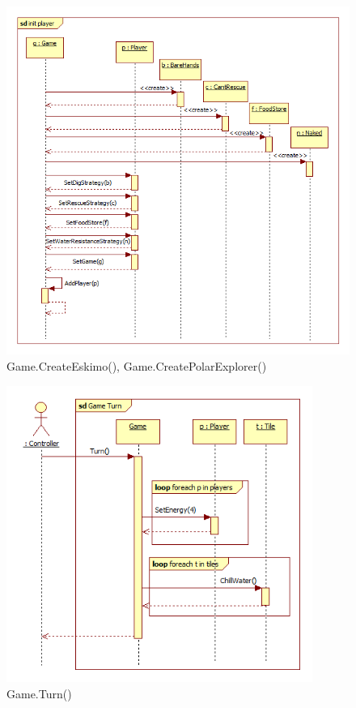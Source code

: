 \begin{figure}[H]
	\begin{center}
		\includegraphics[width=15cm]{chapters/chapter04/seqdiag/Game_init_player.png}
		\caption{Game.CreateEskimo(), Game.CreatePolarExplorer()}
		\label{fig:GameInitPlayer}
	\end{center}
\end{figure}
\begin{figure}[H]
	\begin{center}
		\includegraphics[width=10cm]{chapters/chapter04/seqdiag/Game_Turn.png}
		\caption{Game.Turn()}
		\label{fig:GameTurn}
	\end{center}
\end{figure}
